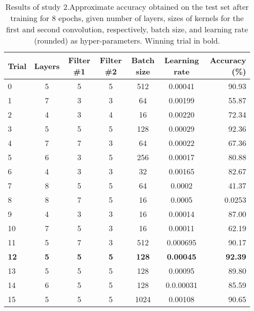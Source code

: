 \documentclass[british,12p]{article}
\begin{document}
	     \begin{table}[h!]
	\begin{center}
    \begin{tabular}{l||c|c|c|c|c||r}
  		Trial & Layers  & Filter \#1 & Filter \#2 & Batch size & Learning rate & Accuracy (\%) \\
  		\hline\hline
  		0 & 5 & 5 & 5 & 512 & 0.00041 & 90.93\\\hline
  		1 & 7 & 3 & 3 & 64 & 0.00199 & 55.87\\\hline
  		2 & 4 & 3 & 4 & 16 & 0.00220 & 72.34\\\hline
  		3 & 5 & 5 & 5 & 128 & 0.00029 & 92.36\\\hline
  		4 & 7 & 7 & 3 & 64 & 0.00022 & 67.36\\\hline
  		5 & 6 & 3 & 5 & 256 & 0.00017 & 80.88\\\hline
  		6 & 4 & 3 & 3 & 32 & 0.00165 & 82.67\\\hline
  		7 & 8 & 5 & 5 & 64 & 0.0002 & 41.37\\\hline
  		8 & 8 & 7 & 5 & 16 & 0.0005 & 0.0253\\\hline
  		9 & 4 & 3 & 3 & 16 & 0.00014 & 87.00\\\hline
  		10 & 7 & 5 & 3 & 16 & 0.00011 & 62.19\\\hline
  		11 & 5 & 7 & 3 & 512 & 0.000695 & 90.17\\\hline
  		\textbf{12} & \textbf{5} & \textbf{5} & \textbf{5} & \textbf{128} & \textbf{0.00045} & \textbf{92.39}\\\hline
  		13 & 5 & 5 & 5 & 128 & 0.00095 & 89.80\\\hline
  		14 & 6 & 5 & 5 & 128 & 0.0.00031 & 85.59 \\\hline
  		15 & 5 & 5 & 5 & 1024 & 0.00108 & 90.65
  		 
	\end{tabular}
	\caption{Results of study 2.Approximate accuracy obtained on the test set after training for 8 epochs, given number of layers, sizes of kernels for the first and second convolution, respectively, batch size, and learning rate (rounded) as hyper-parameters. Winning trial in bold.}
	\end{center}
	\label{tab-res2}
	 \end{table}
\end{document}
